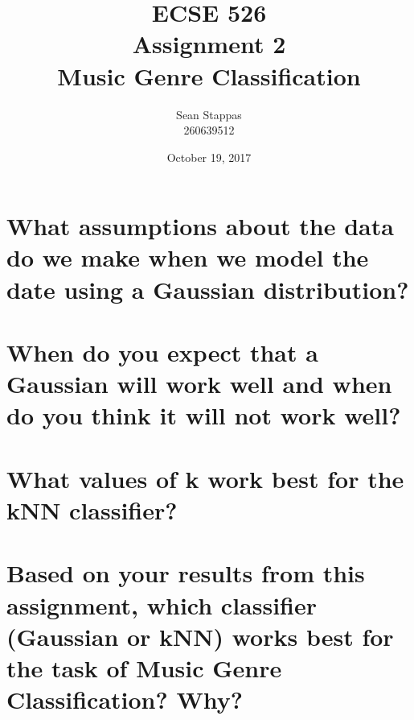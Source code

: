 \documentclass[a4paper,titlepage]{article}
\title{
	\textbf{ECSE 526 \\ Assignment 2}
	\\ \large Music Genre Classification
}
\author{Sean Stappas \\ 260639512}
\date{October 19, 2017}
\begin{document}
	\sloppy
	\maketitle
	\twocolumn
	
	\section{What assumptions about the data do we make when we model the date using a Gaussian distribution?}
	
	
	\section{When do you expect that a Gaussian will work well and when do you think it will not work well?}
	
	\section{What values of k work best for the kNN classifier?}
	
	\section{Based on your results from this assignment, which classifier (Gaussian or kNN) works best for the task of Music Genre Classification? Why?}
	
	
\end{document}
